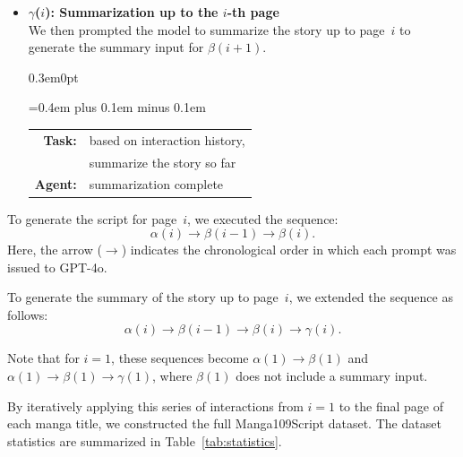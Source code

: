\begin{itemize}
    \item \textbf{$\gamma$($i$): Summarization up to the $i$-th page} \\
    We then prompted the model to summarize the story up to page~$i$ to generate the summary input for $\beta(i+1)$.

    \vspace{0.5em}
    \begin{adjustwidth}{0.3em}{0pt}
    \setlength{\tabcolsep}{2pt}
    {\ttfamily\spaceskip=0.4em plus 0.1em minus 0.1em
    \begin{tabular}{@{}r l@{}}
    \textbf{Task:} & based on interaction history, \\
                   & summarize the story so far  \\
    \textbf{Agent:} & summarization complete \\
    \end{tabular}
    }
    \end{adjustwidth}
\end{itemize}
\vspace{0.5em} 

To generate the script for page~$i$, we executed the sequence:
\[
\alpha(i) \rightarrow \beta(i{-}1) \rightarrow \beta(i).
\]
Here, the arrow ($\rightarrow$) indicates the chronological order in which each prompt was issued to GPT-4o.

To generate the summary of the story up to page~$i$, we extended the sequence as follows:
\[
\alpha(i) \rightarrow \beta(i{-}1) \rightarrow \beta(i) \rightarrow \gamma(i).
\]

Note that for $i = 1$, these sequences become $\alpha(1) \rightarrow \beta(1)$ and $\alpha(1) \rightarrow \beta(1)\rightarrow \gamma(1)$, where $\beta(1)$ does not include a summary input.

By iteratively applying this series of interactions from $i = 1$ to the final page of each manga title, we constructed the full Manga109Script dataset. The dataset statistics are summarized in Table~\ref{tab:statistics}.

